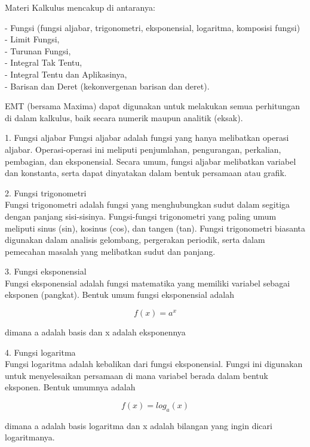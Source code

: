 \documentclass{article}
\begin{document}
\begin{eulernotebook}
\begin{eulercomment}
Materi Kalkulus mencakup di antaranya:

- Fungsi (fungsi aljabar, trigonometri, eksponensial, logaritma,
komposisi fungsi)\\
- Limit Fungsi,\\
- Turunan Fungsi,\\
- Integral Tak Tentu,\\
- Integral Tentu dan Aplikasinya,\\
- Barisan dan Deret (kekonvergenan barisan dan deret).

EMT (bersama Maxima) dapat digunakan untuk melakukan semua perhitungan
di dalam kalkulus, baik secara numerik maupun analitik (eksak).

\begin{eulercomment}
\begin{eulercomment}
1. Fungsi aljabar Fungsi aljabar adalah fungsi yang hanya melibatkan
operasi aljabar. Operasi-operasi ini meliputi penjumlahan,
pengurangan, perkalian, pembagian, dan eksponensial. Secara umum,
fungsi aljabar melibatkan variabel dan konstanta, serta dapat
dinyatakan dalam bentuk persamaan atau grafik.

2. Fungsi trigonometri\\
Fungsi trigonometri adalah fungsi yang menghubungkan sudut dalam
segitiga dengan panjang sisi-sisinya. Fungsi-fungsi trigonometri yang
paling umum meliputi sinus (sin), kosinus (cos), dan tangen (tan).
Fungsi trigonometri biasanta digunakan dalam analisis gelombang,
pergerakan periodik, serta dalam pemecahan masalah yang melibatkan
sudut dan panjang.

3. Fungsi eksponensial\\
Fungsi eksponensial adalah fungsi matematika yang memiliki variabel
sebagai eksponen (pangkat). Bentuk umum fungsi eksponensial adalah\\
\end{eulercomment}
\begin{eulerformula}
\[
f(x)=a^{x}
\]
\end{eulerformula}
\begin{eulercomment}
dimana a adalah basis dan x adalah eksponennya

4. Fungsi logaritma\\
Fungsi logaritma adalah kebalikan dari fungsi eksponensial. Fungsi ini
digunakan untuk menyelesaikan persamaan di mana variabel berada dalam
bentuk eksponen. Bentuk umumnya adalah\\
\end{eulercomment}
\begin{eulerformula}
\[
f(x)=log_a (x)
\]
\end{eulerformula}
\begin{eulercomment}
dimana a adalah basis logaritma dan x adalah bilangan yang ingin
dicari logaritmanya.


\end{eulercomment}
\end{eulercomment}
\end{eulercomment}
\end{eulernotebook}
\end{document}
